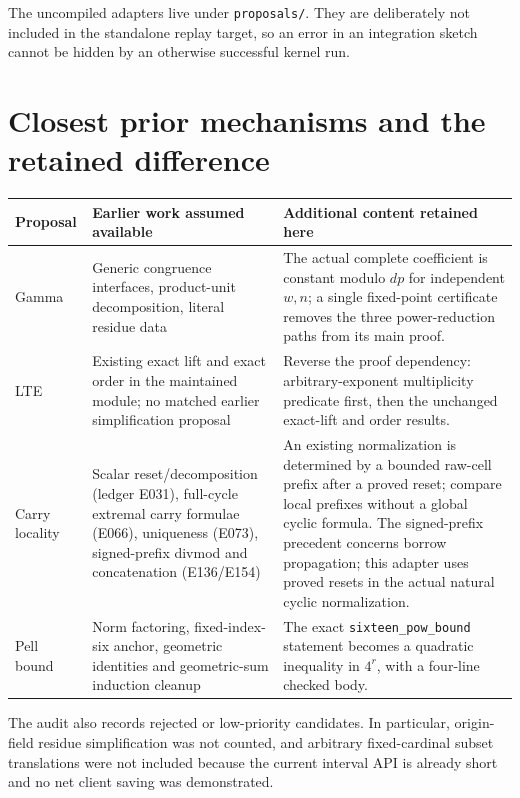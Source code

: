 \documentclass[11pt]{article}
\newcommand{\code}[1]{\nolinkurl{#1}}
\begin{document}
The uncompiled adapters live under \code{proposals/}. They are deliberately not
included in the standalone replay target, so an error in an integration sketch
cannot be hidden by an otherwise successful kernel run.

\section{Closest prior mechanisms and the retained difference}
\begingroup\small
\begin{longtable}{@{}>{\raggedright\arraybackslash}p{2.1cm}>{\raggedright\arraybackslash}p{5.2cm}>{\raggedright\arraybackslash}p{6.8cm}@{}}
\toprule
Proposal & Earlier work assumed available & Additional content retained here\\
\midrule
\endhead
Gamma & Generic congruence interfaces, product-unit decomposition, literal residue data & The actual complete coefficient is constant modulo \(dp\) for independent \(w,n\); a single fixed-point certificate removes the three power-reduction paths from its main proof.\\[6pt]
LTE & Existing exact lift and exact order in the maintained module; no matched earlier simplification proposal & Reverse the proof dependency: arbitrary-exponent multiplicity predicate first, then the unchanged exact-lift and order results.\\[6pt]
Carry locality & Scalar reset/decomposition (ledger E031), full-cycle extremal carry formulae (E066), uniqueness (E073), signed-prefix divmod and concatenation (E136/E154) & An existing normalization is determined by a bounded raw-cell prefix after a proved reset; compare local prefixes without a global cyclic formula. The signed-prefix precedent concerns borrow propagation; this adapter uses proved resets in the actual natural cyclic normalization.\\[6pt]
Pell bound & Norm factoring, fixed-index-six anchor, geometric identities and geometric-sum induction cleanup & The exact \code{sixteen_pow_bound} statement becomes a quadratic inequality in \(4^r\), with a four-line checked body.\\
\bottomrule
\end{longtable}
\endgroup

The audit also records rejected or low-priority candidates. In particular,
origin-field residue simplification was not counted, and arbitrary fixed-cardinal
subset translations were not included because the current interval API is
already short and no net client saving was demonstrated.
\end{document}

